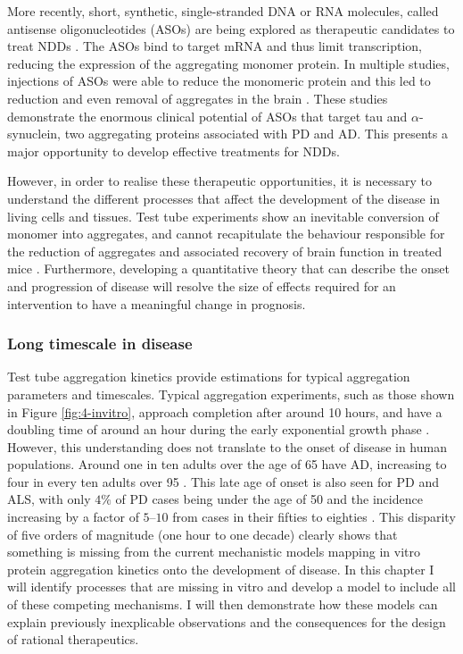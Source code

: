 More recently, short, synthetic, single-stranded DNA or RNA molecules, called antisense oligonucleotides (ASOs) are being explored as therapeutic candidates to treat NDDs \cite{rinaldi_antisense_2018}. The ASOs bind to target mRNA and thus limit transcription, reducing the expression of the aggregating monomer protein. In multiple studies, injections of ASOs were able to reduce the monomeric protein and this led to reduction and even removal of aggregates in the brain \cite{cole_-synuclein_2021, devos_tau_2017, mummery_tau-targeting_2023}. These studies demonstrate the enormous clinical potential of ASOs that target tau and $\alpha$-synuclein, two aggregating proteins associated with PD and AD. This presents a major opportunity to develop effective treatments for NDDs.

However, in order to realise these therapeutic opportunities, it is necessary to understand the different processes that affect the development of the disease in living cells and tissues. Test tube experiments show an inevitable conversion of monomer into aggregates, and cannot recapitulate the behaviour responsible for the reduction of aggregates and associated recovery of brain function in treated mice \cite{cole_-synuclein_2021}. Furthermore, developing a quantitative theory that can describe the onset and progression of disease will resolve the size of effects required for an intervention to have a meaningful change in prognosis.

\subsubsection{Long timescale in disease}\label{subsubsec:onsetage}

Test tube aggregation kinetics provide estimations for typical aggregation parameters and timescales. Typical aggregation experiments, such as those shown in Figure \ref{fig:4-invitro}, approach completion after around 10 hours, and have a doubling time of around an hour during the early exponential growth phase \cite{meisl_mechanistic_2022}. However, this understanding does not translate to the onset of disease in human populations. Around one in ten adults over the age of 65 have AD, increasing to four in every ten adults over 95 \cite{hou_ageing_2019}. This late age of onset is also seen for PD and ALS, with only $4\%$ of PD cases being under the age of 50 and the incidence increasing by a factor of $5$–$10$ from cases in their fifties to eighties \cite{van_den_eeden_incidence_2003, poewe_parkinson_2017}. This disparity of five orders of magnitude (one hour to one decade) clearly shows that something is missing from the current mechanistic models mapping in vitro protein aggregation kinetics onto the development of disease. In this chapter I will identify processes that are missing in vitro and develop a model to include all of these competing mechanisms. I will then demonstrate how these models can explain previously inexplicable observations and the consequences for the design of rational therapeutics.

